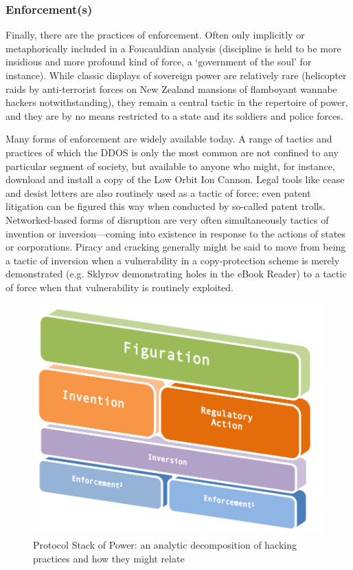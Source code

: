 \documentclass[10pt,letter,oneside]{scrartcl}
\begin{document}
\subsubsection{Enforcement(s)}

Finally, there are the practices of enforcement. Often only implicitly or metaphorically included in a Foucauldian analysis (discipline is held to be more insidious and more profound kind of force, a ‘government of the soul’ for instance).  While classic displays of sovereign power are relatively rare (helicopter raids by anti-terrorist forces on New Zealand mansions of flamboyant wannabe hackers notwithstanding), they remain a central tactic in the repertoire of power, and they are by no means 
restricted to a state and its soldiers and police forces. 

Many forms of enforcement are widely available today.  A range of tactics and practices of which the DDOS is only the most common are not confined to any particular segment of society, but available to anyone who might, for instance, download and install a copy of the Low Orbit Ion Cannon.   Legal tools like cease and desist letters are also routinely used as a tactic of force; even patent litigation can be figured this way when conducted by so-called patent trolls.  Networked-based forms of disruption are very often simultaneously tactics of invention or inversion—coming into existence in response to the actions of states or corporations.  Piracy and cracking generally might be said to move from being a tactic of inversion when a vulnerability in a copy-protection scheme is merely demonstrated (e.g. Sklyrov demonstrating holes in the eBook Reader) to a tactic of force when that vulnerability is routinely exploited.




\begin{figure}
  \centering
  \includegraphics{images/protocolstackV2}
  \caption{Protocol Stack of Power: an analytic decomposition of hacking practices and how they might relate}
  \label{fig:ProtocolStack}
\end{figure}
\end{document}
